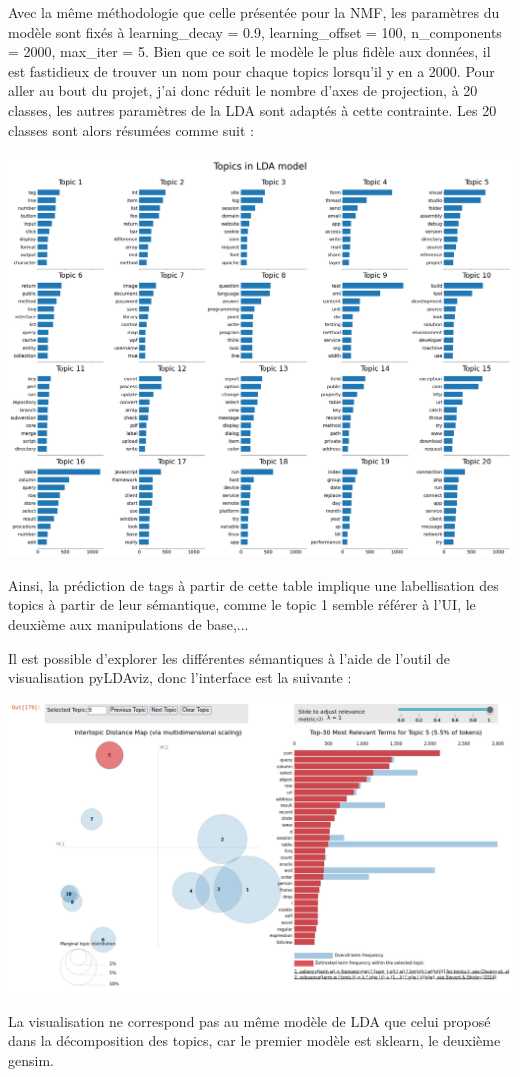 \documentclass[a4paper,11pt]{article}
\begin{document}
\vspace{0.2cm}

Avec la même méthodologie que celle présentée pour la NMF, les paramètres du modèle sont fixés à learning\_decay = 0.9, learning\_offset = 100, n\_components = 2000, max\_iter = 5. Bien que ce soit le modèle le plus fidèle aux données, il est fastidieux de trouver un nom pour chaque topics lorsqu'il y en a 2000. Pour aller au bout du projet, j'ai donc réduit le nombre d'axes de projection, à 20 classes, les autres paramètres de la LDA sont adaptés à cette contrainte. Les 20 classes sont alors résumées comme suit : 

\begin{center}
   \includegraphics[width=0.9\linewidth]{figures/coprus_LDA_small_topics.png}
\end{center}

Ainsi, la prédiction de tags à partir de cette table implique une labellisation des topics à partir de leur sémantique, comme le topic 1 semble référer à l'UI, le deuxième aux manipulations de base,...

Il est possible d'explorer les différentes sémantiques à l'aide de l'outil de visualisation pyLDAviz, donc l'interface est la suivante :

\begin{center}
   \includegraphics[width=\linewidth]{illustrations/pyLDAviz_topic5_web.png}
\end{center}
La visualisation ne correspond pas au même modèle de LDA que celui proposé dans la décomposition des topics, car le premier modèle est sklearn, le deuxième gensim.
\end{document}
